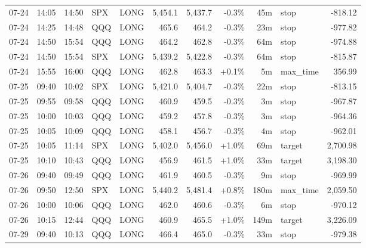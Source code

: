 \documentclass[11pt,a4paper,twoside]{article}
\begin{document}
\begin{center}
\begin{longtable}{>{\color{txtmain}}l l l l l r r r r >{\color{txtmain}}l r}
07-24 & 14:05 & 14:50 & SPX & LONG & 5,454.1 & 5,437.7 & \textcolor{lossred}{-0.3\%} & 45m & stop & \textcolor{lossred}{-818.12} \\
07-24 & 14:25 & 14:48 & QQQ & LONG & 465.6 & 464.2 & \textcolor{lossred}{-0.3\%} & 23m & stop & \textcolor{lossred}{-977.82} \\
07-24 & 14:50 & 15:54 & QQQ & LONG & 464.2 & 462.8 & \textcolor{lossred}{-0.3\%} & 64m & stop & \textcolor{lossred}{-974.88} \\
07-24 & 14:50 & 15:54 & SPX & LONG & 5,439.2 & 5,422.8 & \textcolor{lossred}{-0.3\%} & 64m & stop & \textcolor{lossred}{-815.87} \\
07-24 & 15:55 & 16:00 & QQQ & LONG & 462.8 & 463.3 & \textcolor{wingreen}{+0.1\%} & 5m & max\_time & \textcolor{wingreen}{356.99} \\
07-25 & 09:40 & 10:02 & SPX & LONG & 5,421.0 & 5,404.7 & \textcolor{lossred}{-0.3\%} & 22m & stop & \textcolor{lossred}{-813.15} \\
07-25 & 09:55 & 09:58 & QQQ & LONG & 460.9 & 459.5 & \textcolor{lossred}{-0.3\%} & 3m & stop & \textcolor{lossred}{-967.87} \\
07-25 & 10:00 & 10:03 & QQQ & LONG & 459.2 & 457.8 & \textcolor{lossred}{-0.3\%} & 3m & stop & \textcolor{lossred}{-964.36} \\
07-25 & 10:05 & 10:09 & QQQ & LONG & 458.1 & 456.7 & \textcolor{lossred}{-0.3\%} & 4m & stop & \textcolor{lossred}{-962.01} \\
07-25 & 10:05 & 11:14 & SPX & LONG & 5,402.0 & 5,456.0 & \textcolor{wingreen}{+1.0\%} & 69m & target & \textcolor{wingreen}{2,700.98} \\
07-25 & 10:10 & 10:43 & QQQ & LONG & 456.9 & 461.5 & \textcolor{wingreen}{+1.0\%} & 33m & target & \textcolor{wingreen}{3,198.30} \\
07-26 & 09:40 & 09:49 & QQQ & LONG & 461.9 & 460.5 & \textcolor{lossred}{-0.3\%} & 9m & stop & \textcolor{lossred}{-969.99} \\
07-26 & 09:50 & 12:50 & SPX & LONG & 5,440.2 & 5,481.4 & \textcolor{wingreen}{+0.8\%} & 180m & max\_time & \textcolor{wingreen}{2,059.50} \\
07-26 & 10:00 & 10:06 & QQQ & LONG & 462.0 & 460.6 & \textcolor{lossred}{-0.3\%} & 6m & stop & \textcolor{lossred}{-970.12} \\
07-26 & 10:15 & 12:44 & QQQ & LONG & 460.9 & 465.5 & \textcolor{wingreen}{+1.0\%} & 149m & target & \textcolor{wingreen}{3,226.09} \\
07-29 & 09:40 & 10:13 & QQQ & LONG & 466.4 & 465.0 & \textcolor{lossred}{-0.3\%} & 33m & stop & \textcolor{lossred}{-979.38} \\

\end{longtable}
\end{center}
\end{document}
